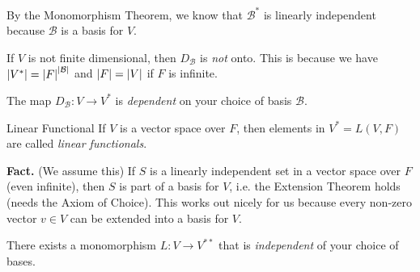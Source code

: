 \documentclass[class=article, crop=false]{standalone}
\begin{document}
  By the Monomorphism Theorem, we know that $\mathcal{B}^*$ is linearly independent because $\mathcal{B}$ is a basis for $V$.
  \begin{note}{}
    If $V$ is not finite dimensional, then $D_{\mathcal{B}}$ is \emph{not} onto. This is because we have $\left\lvert V^* \right\rvert = \left\lvert F \right\rvert^{\left\lvert \mathcal{B} \right\rvert}$ and $\left\lvert F \right\rvert = \left\lvert V \right\rvert$ if $F$ is infinite.
  \end{note}
  \begin{note}{}
    The map $D_{\mathcal{B}}\colon V\to V^*$ is \emph{dependent} on your choice of basis $\mathcal{B}$.
  \end{note}
  \begin{definition}{Linear Functional}
    If $V$ is a vector space over $F$, then elements in $V^* = L(V, F)$ are called \emph{linear functionals}.
  \end{definition}
  \textbf{Fact.} (We assume this) If $S$ is a linearly independent set in a vector space over $F$ (even infinite), then $S$ is part of a basis for $V$, i.e. the Extension Theorem holds (needs the Axiom of Choice). This works out nicely for us because every non-zero vector $v\in V$ can be extended into a basis for $V$.
  \begin{note}{}
    There exists a monomorphism $L\colon V\to V^{* *}$ that is \emph{independent} of your choice of bases.
  \end{note}
\end{document}
